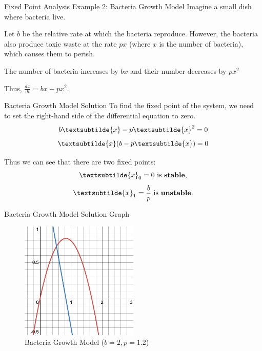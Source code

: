 \documentclass[18pt]{beamer}
\begin{document}
\begin{frame}{Fixed Point Analysis Example 2: Bacteria Growth Model}
    Imagine a small dish where bacteria live.
    \pause{}

    Let $b$ be the relative rate at which the bacteria reproduce.
    \pause{}
    However, the bacteria also produce toxic waste at the rate $px$ (where $x$ is the number of bacteria), which causes them to perish.
    \pause{}

    The number of bacteria increases by $bx$ and their number decreases by $px^{2}$
    \pause{}

    Thus, $\frac{dx}{dt} = bx - px^{2}$.
\end{frame}

\begin{frame}{Bacteria Growth Model Solution}
    To find the fixed point of the system, we need to set the right-hand side of the differential equation to zero.
    \pause{}
    \[b\textsubtilde{x} - p\textsubtilde{x}^{2} = 0\]
    \pause{}
    \[\textsubtilde{x}(b - p\textsubtilde{x}) = 0\]
    \pause{}

    Thus we can see that there are two fixed points:
    \[\textsubtilde{x}_0 = 0 \text{ is \textbf{stable},}\]
    \[\textsubtilde{x}_1 = \frac{b}{p} \text{ is \textbf{unstable}.}\]
\end{frame}

\begin{frame}{Bacteria Growth Model Solution Graph}
    \begin{figure}[t]
        \centering
        \includegraphics[width=0.5\textwidth]{bacteria-growth-model}
        \caption{Bacteria Growth Model ($b = 2 , p = 1.2$)}
    \end{figure}
\end{frame}
\end{document}
